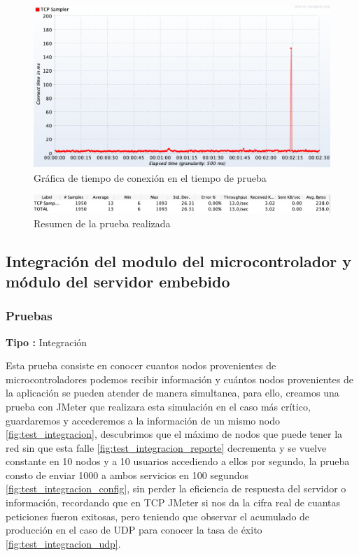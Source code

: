 \begin{figure}[H]
	\centering
	\includegraphics[scale=.3]{Capitulo5/images/real_time_test_connect.png}
	\caption{Gráfica de tiempo de conexión en el tiempo de prueba}
	\label{fig:tcpconnect}
\end{figure} 

\begin{figure}[H]
	\centering
	\includegraphics[scale=.5]{Capitulo5/images/real_time_test_summary.png}
	\caption{Resumen de la prueba realizada}
	\label{fig:tcpsummary}
\end{figure} 

\subsection{Integración del modulo del microcontrolador y módulo del servidor embebido}

\subsubsection{Pruebas}
\textbf{Tipo :} Integración \\ \newline

Esta prueba consiste en conocer cuantos nodos provenientes de microcontroladores podemos recibir información y cuántos nodos provenientes de la aplicación se pueden atender de manera simultanea, para ello, creamos una prueba con JMeter que realizara esta simulación en el caso más crítico, guardaremos y accederemos a la información de un mismo nodo \ref{fig:test_integracion}, descubrimos que el máximo de nodos que puede tener la red sin que esta falle \ref{fig:test_integracion_reporte} decrementa y se vuelve constante en 10 nodos y a 10 usuarios accediendo a ellos por segundo, la prueba consto de enviar 1000 a ambos servicios en 100 segundos \ref{fig:test_integracion_config}, sin perder la eficiencia de respuesta del servidor o información, recordando que en TCP JMeter si nos da la cifra real de cuantas peticiones fueron exitosas, pero teniendo que observar el acumulado de producción en el caso de UDP para conocer la tasa de éxito \ref{fig:test_integracion_udp}.

